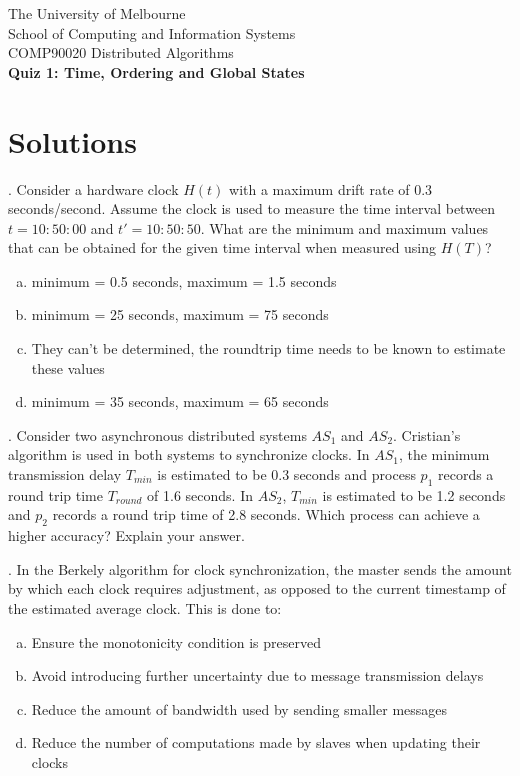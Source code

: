 \documentclass[12pt]{article}
\newcounter{question}
\newcommand{\question}[1]{
    \stepcounter{question}
    \thequestion. #1 \hfill
}
\begin{document}
\begin{center}
    {\sc The University of Melbourne
        \\
        School of Computing and Information Systems
        \\
    COMP90020 Distributed Algorithms}
    \bigskip \\
    {\Large\bf Quiz 1: Time, Ordering and Global States}
    \bigskip \\
\end{center}


\section*{Solutions}

\setcounter{question}{0}

\question{Consider a hardware clock $H(t)$ with a maximum drift rate of 0.3 seconds/second. Assume the clock is used to measure the time interval between $t=10:50:00$ and $t'=10:50:50$. What are the minimum and maximum values that can be obtained for the given time interval when measured using $H(T)$?}

\begin{enumerate}[(a)]
    \item minimum = 0.5 seconds, maximum = 1.5 seconds
    \item minimum = 25 seconds, maximum = 75 seconds
    \item They can't be determined, the roundtrip time needs to be known to estimate these values
    \item minimum = 35 seconds, maximum = 65 seconds
\end{enumerate}

\question{Consider two asynchronous distributed systems $AS_1$ and $AS_2$. Cristian's algorithm is used in both systems to synchronize clocks. In $AS_1$, the minimum transmission delay $T_{min}$ is estimated to be 0.3 seconds and process $p_1$ records a round trip time $T_{round}$ of 1.6 seconds. In $AS_2$, $T_{min}$ is estimated to be 1.2 seconds and $p_2$ records a round trip time of 2.8 seconds. Which process can achieve a higher accuracy? Explain your answer.}

\question{In the Berkely algorithm for clock synchronization, the master sends the amount by which each clock requires adjustment, as opposed to the current timestamp of the estimated average clock. This is done to: }
\begin{enumerate}[(a)]
    \item Ensure the monotonicity condition is preserved
    \item Avoid introducing further uncertainty due to message transmission delays
    \item Reduce the amount of bandwidth used by sending smaller messages
    \item Reduce the number of computations made by slaves when updating their clocks
\end{enumerate}
\end{document}
